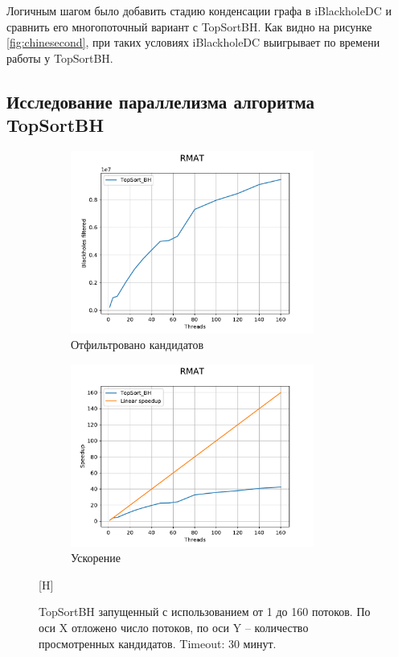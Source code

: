 \documentclass[12pt,a4paper,oneside,openany]{article}
\theoremstyle{definition}
\theoremstyle{lemma}
\theoremstyle{remark}
\begin{document}
Логичным шагом было добавить стадию конденсации графа в iBlackholeDC и сравнить его
многопоточный вариант с TopSortBH. Как видно на рисунке \ref{fig:chinesecond},
при таких условиях iBlackholeDC выигрывает по времени работы у TopSortBH.

\subsection{Исследование параллелизма алгоритма TopSortBH}\label{subsec:topsortasync}

\begin{figure}[H]
    \begin{subfigure}{.5\textwidth}
        \centering
        \includegraphics[width=8cm]{images/many_threads_RMAT.pdf}
        \caption{Отфильтровано кандидатов}
        \label{subfig:manythreads:speedup}
    \end{subfigure}
    \begin{subfigure}{.5\textwidth}
        \centering
        \includegraphics[width=8cm]{images/many_threads_RMAT_speedup.pdf}
        \caption{Ускорение}
        \label{subfig:manythreads:speedup}
    \end{subfigure}[H]
    \caption{TopSortBH запущенный с использованием от 1 до 160 потоков.
По оси X отложено число потоков, по оси Y -- количество просмотренных кандидатов. Timeout: 30 минут.}
    \label{fig:manythreads}
\end{figure}
\end{document}
